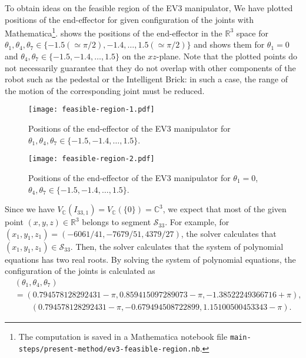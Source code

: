 \documentclass{birkjour}
\theoremstyle{plain}
\theoremstyle{definition}
\newcommand{\R}[0]{\mathbb{R}}
\newcommand{\C}[0]{\mathbb{C}}
\begin{document}
    To obtain ideas on the feasible region of the EV3 manipulator, 
    We have plotted positions of the end-effector for given configuration of the joints 
    with Mathematica\footnote{The computation is saved in a Mathematica notebook file
    \texttt{main-steps/present-method/ev3-feasible-region.nb}.}.
     shows the positions of the end-effector in the 
    $\R^3$ space for 
    $\theta_1,\theta_4,\theta_7\in\{-1.5(\simeq \pi/2),-1.4,\dots,1.5(\simeq\pi/2)\}$
    and  shows them for $\theta_1=0$ and 
    $\theta_4,\theta_7\in\{-1.5,-1.4,\dots,1.5\}$ on the $xz$-plane.
    Note that the plotted points do not necessarily guarantee that they do not overlap
    with other components of the robot such as the pedestal or the Intelligent Brick: 
    in such a case, the range of the motion of the corresponding joint must be
    reduced.
    \begin{figure}[t]
        \centering
        \texttt{[image: feasible-region-1.pdf]}
        \caption{Positions of the end-effector of the EV3 manipulator for 
        $\theta_1,\theta_4,\theta_7\in\{-1.5,-1.4,\dots,1.5\}$.}
        \label{fig:feasible-region-1}
    \end{figure}
    \begin{figure}[t]
        \texttt{[image: feasible-region-2.pdf]}
        \caption{Positions of the end-effector of the EV3 manipulator for $\theta_1=0$, 
        $\theta_4,\theta_7\in\{-1.5,-1.4,\dots,1.5\}$.}
        \label{fig:feasible-region-2}
    \end{figure}

    Since we have $V_{\C}(I_{33,1})=V_{\C}(\{0\})=\C^3$, we expect that most of the 
    given point $(x,y,z)\in\R^3$ belongs to segment $\mathcal{S}_{33}$. 
    For example, for $(x_1,y_1,z_1)=(-6061/41,-7679/51,4379/27)$, the solver 
    calculates that $(x_1,y_1,z_1)\in\mathcal{S}_{33}$. Then, the solver
    calculates that the system of polynomial equations has two real roots.
    By solving 
    the system of polynomial equations, the configuration of the joints is calculated as
    \begin{align*}
        & (\theta_1,\theta_4,\theta_7)\\
        &=(0.794578128292431-\pi,0.859415097289073-\pi,-1.38522249366716+\pi),\\
        &\qquad (0.794578128292431-\pi,-0.679494508722899,1.15100500453343-\pi).    
    \end{align*}
    
\end{document}
